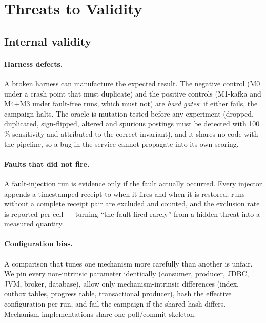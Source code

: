 \section{Threats to Validity}
\label{sec:threats}

\subsection{Internal validity}
\label{sec:threats-internal}

\paragraph{Harness defects.} A broken harness can manufacture the expected result. The negative
control (M0 under a crash point that must duplicate) and the positive controls (M1-kafka and M4+M3
under fault-free runs, which must not) are \emph{hard gates}: if either fails, the campaign
halts. The oracle is mutation-tested before any experiment (dropped, duplicated, sign-flipped,
altered and spurious postings must be detected with 100\,\% sensitivity and attributed to the
correct invariant), and it shares no code with the pipeline, so a bug in the service cannot
propagate into its own scoring.

\paragraph{Faults that did not fire.} A fault-injection run is evidence only if the fault
actually occurred. Every injector appends a timestamped receipt to  when
it fires and when it is restored; runs without a complete receipt pair are excluded and counted,
and the exclusion rate is reported per cell --- turning ``the fault fired rarely'' from a hidden
threat into a measured quantity.

\paragraph{Configuration bias.} A comparison that tunes one mechanism more carefully than
another is unfair. We pin every non-intrinsic parameter identically (consumer, producer, JDBC,
JVM, broker, database), allow only mechanism-intrinsic differences (index, outbox tables,
progress table, transactional producer), hash the effective configuration per run, and fail the
campaign if the shared hash differs. Mechanism implementations share one poll/commit skeleton.

